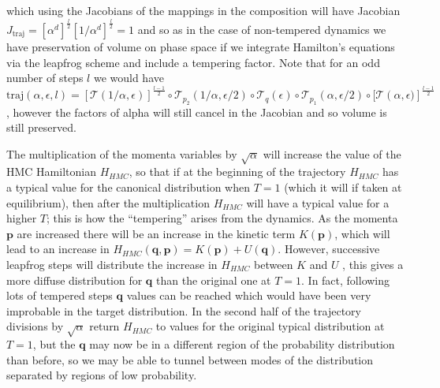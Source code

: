 \documentclass[12pt]{article}
\begin{document}
    which using the Jacobians of the mappings in the composition will have Jacobian $J_{\text{traj}}=\left[\alpha^d\right]^{\frac{l}{2}}\left[1/\alpha^d\right]^{\frac{l}{2}} = 1$ and so as in the case of non-tempered dynamics we have preservation of volume on phase space if we integrate Hamilton's equations via the leapfrog scheme and include a tempering factor. Note that for an odd number of steps $l$ we would have $\text{traj}\left(\alpha,\epsilon,l\right)=\left[\mathcal{T}\left(1/\alpha,\epsilon\right)\right]^{\frac{l-1}{2}}\circ \mathcal{T}_{p_2}\left(1/\alpha,\epsilon/2\right)\circ\mathcal{T}_q\left(\epsilon\right)\circ\mathcal{T}_{p_1}\left(\alpha,\epsilon/2\right)\circ[\mathcal{T}\left(\alpha,\epsilon)\right]^{\frac{l-1}{2}}$, however the factors of alpha will still cancel in the Jacobian and so volume is still preserved.

    The multiplication of the momenta variables by $\sqrt{\alpha}$ will increase the value of the HMC Hamiltonian $H_{HMC}$, so that if at the beginning of the trajectory $H_{HMC}$ has a typical value for the canonical distribution when $T=1$ (which it will if taken at equilibrium), then after the multiplication $H_{HMC}$ will have a typical value for a higher $T$; this is how the ``tempering'' arises from the dynamics. As the momenta $\bm{p}$ are increased there will be an increase in the kinetic term $K\left(\bm{p}\right)$, which will lead to an increase in $H_{HMC}\left(\bm{q},\bm{p}\right) = K\left(\bm{p}\right) + U\left(\bm{q}\right)$. However, successive leapfrog steps will distribute the increase in $H_{HMC}$ between $K$ and $U$ \cite{neal_2011}, this gives a more diffuse distribution for $\bm{q}$ than the original one at $T=1$. In fact, following lots of tempered steps $\bm{q}$ values can be reached which would have been very improbable in the target distribution. In the second half of the trajectory divisions by $\sqrt{\alpha}$ return $H_{HMC}$ to values for the original typical distribution at $T=1$, but the $\bm{q}$ may now be in  a different region of the probability distribution than before, so we may be able to tunnel between modes of the distribution separated by regions of low probability.
\end{document}
